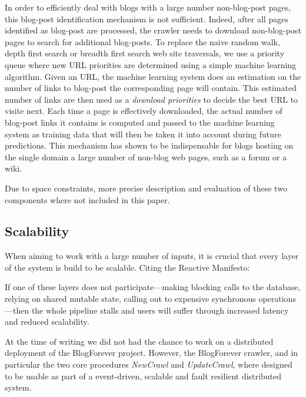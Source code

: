 %
In order to efficiently deal with blogs with a large number non-blog-post pages, this blog-post identification mechanism is not sufficient. Indeed, after all pages identified as blog-post are processed, the crawler needs to download non-blog-post pages to search for additional blog-posts. To replace the naive random walk, depth first search or breadth first search web site traversals, we use a priority queue where new URL priorities are determined using a simple machine learning algorithm. Given an URL, the machine learning system does an estimation on the number of links to blog-post the corresponding page will contain. This estimated number of links are then used as a \emph{download priorities} to decide the best URL to visite next. Each time a page is effectively downloaded, the actual number of blog-post links it contains is computed and passed to the machine learning system as training data that will then be taken it into account during future predictions. This mechanism has shown to be indispensable for blogs hosting on the single domain a large number of non-blog web pages, such as a forum or a wiki.

Due to space constraints, more precise description and evaluation of these two components where not included in this paper.


\subsection{Scalability}
When aiming to work with a large number of inputs, it is crucial that every layer of the system is build to be scalable. Citing the Reactive Manifesto\cite{thereactivemanifesto2013}:

\begin{quoting}
  If one of these layers does not participate—making blocking calls to the database, relying on shared mutable state, calling out to expensive synchronous operations—then the whole pipeline stalls and users will suffer through increased latency and reduced scalability.
\end{quoting}

At the time of writing we did not had the chance to work on a distributed deployment of the BlogForever project. However, the BlogForever crawler, and in particular the two core procedures \emph{NewCrawl} and \emph{UpdateCrawl}, where designed to be usable as part of a event-driven, scalable and fault resilient distributed system.

